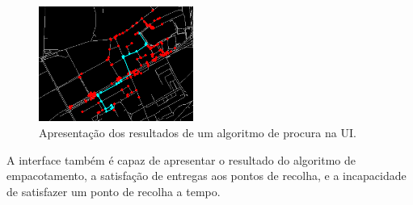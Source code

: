 \documentclass[12pt, a4paper, titlepage]{article}
\begin{document}
\begin{figure}[H]
    \centering
    \includegraphics[width=0.45\textwidth]{res/Procura.png}
    \caption{Apresentação dos resultados de um algoritmo de procura na UI.}
\end{figure}

A interface também é capaz de apresentar o resultado do algoritmo de empacotamento, a satisfação de
entregas aos pontos de recolha, e a incapacidade de satisfazer um ponto de recolha a tempo.
\end{document}
